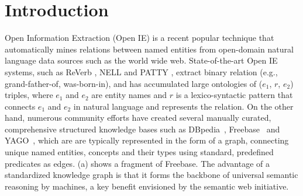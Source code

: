 \section{Introduction}
\label{sec:intro}


Open Information Extraction (Open IE) is a recent popular technique
that automatically mines relations between named entities 
from open-domain natural language
data sources such as the world wide web. 
State-of-the-art Open IE systems, such as ReVerb \cite{fader2011identifying},
NELL \cite{} and PATTY \cite{nakashole2012patty}, extract binary 
relation (e.g., grand-father-of, was-born-in), and has accumulated large 
ontologies of ($e_1$, $r$, $e_2$) triples, where $e_1$ and $e_2$ are
entity names and $r$ is a lexico-syntactic pattern that connects 
$e_1$ and $e_2$ in natural language and represents the relation. 
On the other hand, numerous community efforts have
created several manually curated, comprehensive structured knowledge bases
such as DBpedia~\cite{}, Freebase~\cite{} and YAGO~\cite{}, which are
are typically represented in the form of a graph, 
connecting unique named entities, concepts and their types 
using standard, predefined predicates as edges. 
 (a) shows a fragment of Freebase.
The advantage of a standardized knowledge graph is that it forms the backbone
of universal semantic reasoning by machines, a key benefit envisioned by 
the semantic web initiative. 

